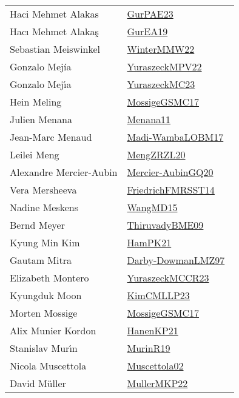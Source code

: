 {\begin{longtable}{p{4cm}p{20cm}}
Haci Mehmet Alakas & \href{works/GurPAE23.pdf}{GurPAE23}~\cite{GurPAE23}\\
Hacı Mehmet Alakaş & \href{works/GurEA19.pdf}{GurEA19}~\cite{GurEA19}\\
Sebastian Meiswinkel & \href{works/WinterMMW22.pdf}{WinterMMW22}~\cite{WinterMMW22}\\
Gonzalo Mej{\'i}a & \href{works/YuraszeckMPV22.pdf}{YuraszeckMPV22}~\cite{YuraszeckMPV22}\\
Gonzalo Mej{\'{\i}}a & \href{works/YuraszeckMC23.pdf}{YuraszeckMC23}~\cite{YuraszeckMC23}\\
Hein Meling & \href{works/MossigeGSMC17.pdf}{MossigeGSMC17}~\cite{MossigeGSMC17}\\
Julien Menana & \href{}{Menana11}~\cite{Menana11}\\
Jean{-}Marc Menaud & \href{works/Madi-WambaLOBM17.pdf}{Madi-WambaLOBM17}~\cite{Madi-WambaLOBM17}\\
Leilei Meng & \href{works/MengZRZL20.pdf}{MengZRZL20}~\cite{MengZRZL20}\\
Alexandre Mercier{-}Aubin & \href{works/Mercier-AubinGQ20.pdf}{Mercier-AubinGQ20}~\cite{Mercier-AubinGQ20}\\
Vera Mersheeva & \href{}{FriedrichFMRSST14}~\cite{FriedrichFMRSST14}\\
Nadine Meskens & \href{works/WangMD15.pdf}{WangMD15}~\cite{WangMD15}\\
Bernd Meyer & \href{works/ThiruvadyBME09.pdf}{ThiruvadyBME09}~\cite{ThiruvadyBME09}\\
Kyung Min Kim & \href{works/HamPK21.pdf}{HamPK21}~\cite{HamPK21}\\
Gautam Mitra & \href{works/Darby-DowmanLMZ97.pdf}{Darby-DowmanLMZ97}~\cite{Darby-DowmanLMZ97}\\
Elizabeth Montero & \href{works/YuraszeckMCCR23.pdf}{YuraszeckMCCR23}~\cite{YuraszeckMCCR23}\\
Kyungduk Moon & \href{works/KimCMLLP23.pdf}{KimCMLLP23}~\cite{KimCMLLP23}\\
Morten Mossige & \href{works/MossigeGSMC17.pdf}{MossigeGSMC17}~\cite{MossigeGSMC17}\\
Alix Munier Kordon & \href{works/HanenKP21.pdf}{HanenKP21}~\cite{HanenKP21}\\
Stanislav Mur{\'{\i}}n & \href{works/MurinR19.pdf}{MurinR19}~\cite{MurinR19}\\
Nicola Muscettola & \href{works/Muscettola02.pdf}{Muscettola02}~\cite{Muscettola02}\\
David M{\"{u}}ller & \href{works/MullerMKP22.pdf}{MullerMKP22}~\cite{MullerMKP22}\\

\end{longtable}}
